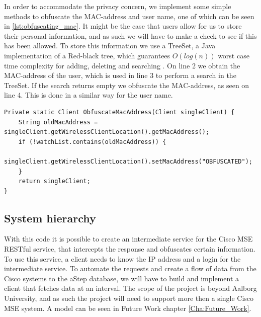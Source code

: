 In order to accommodate the privacy concern, we implement some simple methods to obfuscate the MAC-address and user name, one of which can be seen in \cref{lst:obfuscating_mac}. It might be the case that users allow for us to store their personal information, and as such we will have to make a check to see if this has been allowed. To store this information we use a TreeSet, a Java implementation of a Red-black tree, which guarantees $O(log(n))$ worst case time complexity for adding, deleting and searching \cite{aa_book}\cite{treeset}. On line 2 we obtain the MAC-address of the user, which is used in line 3 to perform a search in the TreeSet. If the search returns empty we obfuscate the MAC-address, as seen on line 4. This is done in a similar way for the user name.

\begin{lstlisting}[caption={Obfuscating mac-address},label={lst:obfuscating_mac},language=inc_Java]
Private static Client ObfuscateMacAddress(Client singleClient) {
    String oldMacAddress = singleClient.getWirelessClientLocation().getMacAddress();
    if (!watchList.contains(oldMacAddress)) {
        singleClient.getWirelessClientLocation().setMacAddress("OBFUSCATED");
    }
    return singleClient;
}
\end{lstlisting}

\subsection{System hierarchy}\label{subsec:system_hierarchy}
With this code it is possible to create an intermediate service for the Cisco MSE RESTful service, that intercepts the response and obfuscates certain information. To use this service, a client needs to know the IP address and a login for the intermediate service. To automate the requests and create a flow of data from the Cisco systems to the aStep database, we will have to build and implement a client that fetches data at an interval. The scope of the project is beyond Aalborg University, and as such the project will need to support more then a single Cisco MSE system. A model can be seen in Future Work chapter \ref{Cha:Future_Work}. 